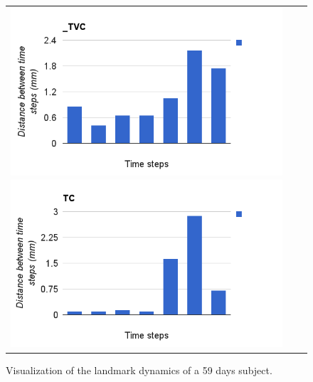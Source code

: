 \begin{figure}[tb]
  \begin{center}
    \begin{tabular}{ccc}
    \includegraphics[width=\figwidth] {fig/d_TVC.png}
    \includegraphics[width=\figwidth] {fig/dTC.png}
    \end{tabular}
    \caption{ \label{fig:landmark_dynamics} Visualization of the landmark dynamics of a 59 days subject. 
    }
  \end{center}
\end{figure}

